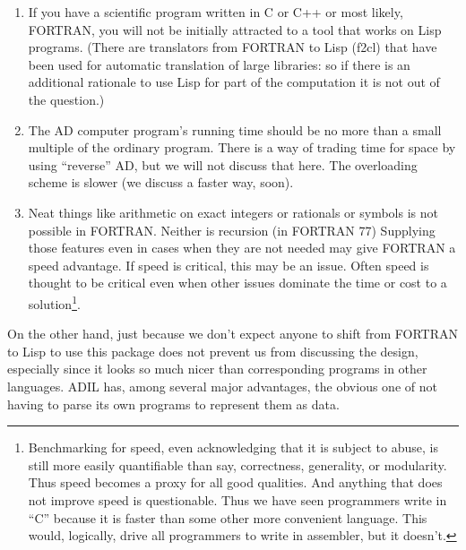 \documentclass{article}
\begin{document}
\begin{enumerate}
\item If you have a scientific program written in C or C++ or most
likely, FORTRAN, you will not be initially attracted to a tool that
works on Lisp programs. (There are translators from FORTRAN to
Lisp (f2cl) that have been used for automatic translation of large
libraries: so if there is an additional rationale
to use Lisp for part of the computation it is not out of the question.)
\item The AD computer program's running time should be no more
than a small multiple of the ordinary program.  There is a way
of trading time for space by using ``reverse'' AD, but we will not 
discuss that here.  The overloading scheme is slower (we discuss a faster way, soon).
\item Neat things like arithmetic on exact integers or rationals 
or symbols is not possible in FORTRAN. Neither is recursion (in
FORTRAN 77)
Supplying those features even in cases when they are not needed
may give FORTRAN a speed advantage. If speed is critical, this may
be an issue.  Often speed is thought to be critical even when other
issues dominate the time or cost to a solution\footnote{Benchmarking for speed, even acknowledging
that it is subject to abuse, is still more easily quantifiable than
say, correctness, generality, or modularity. Thus speed 
becomes a proxy for all good
qualities. And anything that does not improve speed is questionable.
Thus we have seen programmers write in ``C'' because it is faster than some
other more convenient language.
This would, logically, drive all programmers to write in assembler, but 
it doesn't.}.

\end{enumerate}

On the other hand, just because we don't expect anyone to
shift from FORTRAN to Lisp to use this package
does not prevent us from discussing the design, especially
since it looks so much nicer than corresponding programs in
other languages. 
ADIL has, among several major advantages, the obvious one of not
having to parse its own programs to represent them as data.
\end{document}
